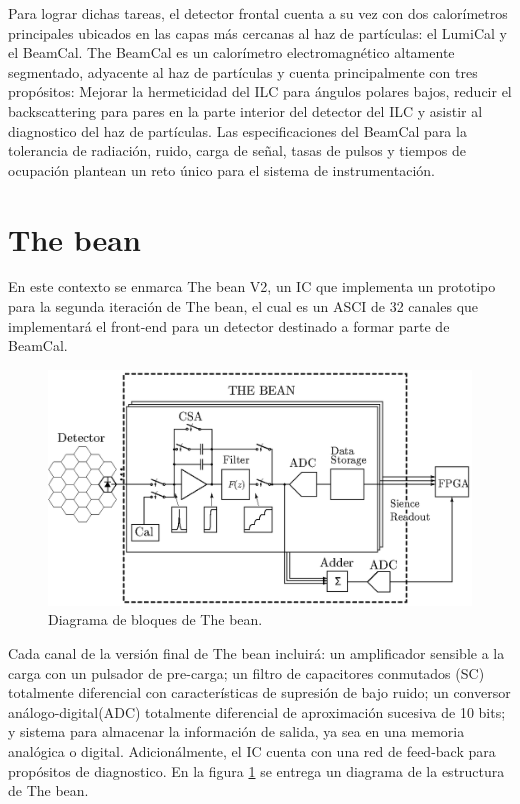 Para lograr dichas tareas, el detector frontal cuenta a su vez con dos calorímetros principales ubicados en las capas más cercanas al haz de partículas: el LumiCal y el BeamCal.
The BeamCal es un calorímetro electromagnético altamente segmentado,  adyacente al haz de partículas y cuenta principalmente con tres propósitos: Mejorar la hermeticidad del ILC para ángulos polares bajos, reducir el backscattering para pares en la parte interior del detector del ILC y asistir al diagnostico del haz de partículas. Las especificaciones del BeamCal para la tolerancia de radiación, ruido, carga de señal, tasas de pulsos y tiempos de ocupación plantean un reto único para el sistema de instrumentación. 

\section{The bean}
En este contexto se enmarca The bean V2, un IC que implementa un prototipo para la segunda iteración de The bean, el cual es un ASCI de 32 canales que implementará el front-end  para un detector destinado a formar parte de BeamCal. 

\begin{figure}[!t]
	\centering
	\includegraphics[width=5in]{./figures/thebeamdiagram-02.eps}
	\caption{Diagrama de bloques de The bean.}\label{fig:thebean_diagram}
\end{figure}

Cada canal de la versión final de The bean incluirá: un amplificador sensible a la carga con un pulsador de pre-carga; un filtro de capacitores conmutados (SC) totalmente diferencial con características de supresión de bajo ruido; un conversor análogo-digital(ADC) totalmente diferencial de aproximación sucesiva de 10 bits; y sistema para almacenar la información de salida, ya sea en una memoria analógica o digital. Adicionálmente, el IC cuenta con una red de feed-back para propósitos de diagnostico. En la figura \ref{fig:thebean_diagram} se entrega un diagrama de la estructura de The bean. 
 
